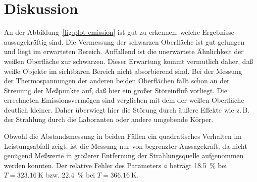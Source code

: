 \section{Diskussion}

An der Abbildung~\ref{fig:plot-emission} ist gut zu erkennen, welche
Ergebnisse aussagekräftig sind. Die Vermessung der schwarzen Oberfläche
ist gut gelungen und liegt im erwarteten Bereich.  Auffallend ist die
unerwartete Ähnlichkeit der weißen Oberfläche zur schwarzen. Dieser
Erwartung kommt vermutlich daher, daß weiße Objekte im sichtbaren
Bereich nicht absorbierend sind. Bei der Messung der Thermospannungen
der anderen beiden Oberflächen fällt schon an der Streuung der Meßpunkte
auf, daß hier ein großer Störeinfluß vorliegt.  Die errechneten
Emissionsvermögen sind verglichen mit dem der weißen Oberfläche deutlich
kleiner. Daher überwiegt hier die Störung durch äußere Effekte wie
z.\,B. der Strahlung durch die Laboranten oder andere umgebende Körper.

Obwohl die Abstandsmessung in beiden Fällen ein quadratisches Verhalten
im Leistungsabfall zeigt, ist die Messung nur von begrenzter
Aussagekraft, da nicht genügend Meßwerte in größerer Entfernung der
Strahlungsquelle aufgenommen werden konnten. Der relative Fehler des
Parameters $a$ beträgt \SI{18.5}{\percent} bei $T = \SI{323.16}{\kelvin}$
bzw. \SI{22.4}{\percent} bei $T = \SI{366.16}{\kelvin}$.
